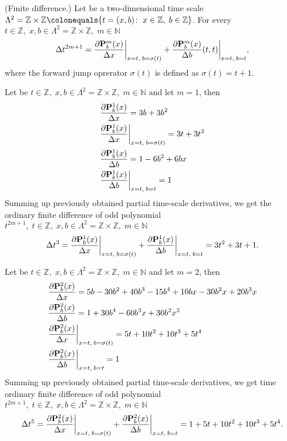 \begin{cor}
    \label{finite_difference_case}
    (Finite difference.)
    Let be a two-dimensional time scale
    $\Lambda^2 = \mathbb{Z} \times \mathbb{Z} \colonequals \{t=(x, b) \colon \; x\in \mathbb{Z}, \; b\in \mathbb{Z} \}$.
    For every $t\in\mathbb{Z}, \; x,b\in \Lambda^2 = \mathbb{Z} \times \mathbb{Z}, \; m\in\mathbb{N}$
    \[
        \Delta t^{2m+1}
        = \frac{\partial {\mathbf{P}}\sp{m} \sb{b}(x)}{\Delta x} \bigg |_{x = t, \; b = \sigma(t)}
        + \frac{\partial {\mathbf{P}}\sp{m} \sb{b}(x)}{\Delta b}(t, t) \bigg |_{x = t, \; b = t},
    \]
    where the forward jump oprerator $\sigma(t)$ is defined as $\sigma(t) = t+1$.
\end{cor}
\begin{examp}
    Let be $t\in\mathbb{Z}, \;x,b\in\Lambda^2 = \mathbb{Z} \times \mathbb{Z}, \; m\in\mathbb{N}$ and let $m=1$, then
    \begin{align*}
        &\frac{\partial {\mathbf{P}}\sp{1} \sb{b}(x)}{\Delta x} = 3 b + 3 b^2 \\
        &\frac{\partial {\mathbf{P}}\sp{1} \sb{b}(x)}{\Delta x} \bigg |_{x = t, \; b = \sigma(t)} = 3 t + 3 t^2\\
        &\frac{\partial {\mathbf{P}}\sp{1} \sb{b}(x)}{\Delta b}= 1 - 6 b^2 + 6 b x\\
        &\frac{\partial {\mathbf{P}}\sp{1} \sb{b}(x)}{\Delta b}\bigg |_{x = t, \; b = t}= 1
    \end{align*}
    Summing up previously obtained partial time-scale derivatives, we get the ordinary finite difference of odd polynomial
    $t^{2m+1}, \; t\in\mathbb{Z}, \; x,b\in\Lambda^2 = \mathbb{Z} \times \mathbb{Z}, \; m\in\mathbb{N}$
    \[
        \Delta t^{3}
        = \frac{\partial {\mathbf{P}}\sp{1} \sb{b}(x)}{\Delta x} \bigg |_{x = t, \; b = \sigma(t)}
        + \frac{\partial {\mathbf{P}}\sp{1} \sb{b}(x)}{\Delta b} \bigg |_{x = t, \; b = t}
        = 3 t^2 + 3 t + 1.
    \]
\end{examp}
\begin{examp}
    Let be $t\in\mathbb{Z}, \;x,b\in\Lambda^2 = \mathbb{Z} \times \mathbb{Z}, \; m\in\mathbb{N}$
    and let $m=2$, then
    \begin{align*}
        &\frac{\partial {\mathbf{P}}\sp{2} \sb{b}(x)}{\Delta x} = 5 b - 30 b^2 + 40 b^3 - 15 b^4 + 10 b x - 30 b^2 x + 20 b^3 x \\
        &\frac{\partial {\mathbf{P}}\sp{2} \sb{b}(x)}{\Delta b} = 1 + 30 b^4 - 60 b^3 x + 30 b^2 x^2 \\
        &\frac{\partial {\mathbf{P}}\sp{2} \sb{b}(x)}{\Delta x} \bigg |_{x = t, \; b = \sigma(t)} = 5 t + 10 t^2 + 10 t^3 + 5 t^4 \\
        &\frac{\partial {\mathbf{P}}\sp{2} \sb{b}(x)}{\Delta b} \bigg |_{x = t, \; b = t} = 1
    \end{align*}
    Summing up previously obtained partial time-scale derivatives, we get time ordinary finite difference of odd polynomial
    $t^{2m+1}, \; t\in\mathbb{Z}, \;x,b\in\Lambda^2 = \mathbb{Z} \times \mathbb{Z}, \; m\in\mathbb{N}$
    \[
        \Delta t^{5}
        = \frac{\partial {\mathbf{P}}\sp{2} \sb{b}(x)}{\Delta x} \bigg |_{x = t, \; b = \sigma(t)}
        + \frac{\partial {\mathbf{P}}\sp{2} \sb{b}(x)}{\Delta b} \bigg |_{x = t, \; b = t}
        = 1 + 5 t + 10 t^2 + 10 t^3 + 5 t^4.
    \]
\end{examp}
